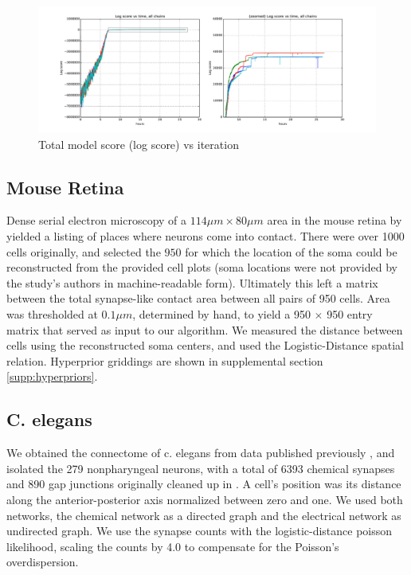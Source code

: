 \documentclass{article}
\begin{document}
\begin{figure}
  \centering 
  \centerline{\includegraphics[width=130mm]{mixing.scorevstime.pdf}}
  \caption{Total model score (log score) vs iteration}
\label{fig:mixing:scorevstime}
\end{figure}


\subsection* {Mouse Retina}
\label{supp:mouseretina}
Dense serial electron microscopy of a $114\mu m \times 80 \mu m $ area
in the mouse retina by \autocite{Helmstaedter2013} yielded a listing
of places where neurons come into contact. There were over 1000 cells
originally, and selected the $950$ for which the location of the soma
could be reconstructed from the provided cell plots (soma locations
were not provided by the study's authors in machine-readable
form). Ultimately this left a matrix between the total synapse-like
contact area between all pairs of 950 cells. Area was thresholded at
$0.1\mu m$, determined by hand, to yield a 950 $\times$ 950 entry
matrix that served as input to our algorithm. We measured the distance
between cells using the reconstructed soma centers, and used the
Logistic-Distance spatial relation. Hyperprior griddings are shown in
supplemental section \ref{supp:hyperpriors}.

\subsection*{C. elegans}

We obtained the connectome of c. elegans from data published
previously \autocite{Varshney2011}, and isolated the 279 nonpharyngeal
neurons, with a total of 6393 chemical synapses and 890 gap junctions
originally cleaned up in \autocite{Chen2006}. A cell's position was
its distance along the anterior-posterior axis normalized between zero
and one. We used both networks, the chemical network as a directed
graph and the electrical network as undirected graph. We use the
synapse counts with the logistic-distance poisson likelihood, scaling
the counts by 4.0 to compensate for the Poisson's overdispersion.
\end{document}
